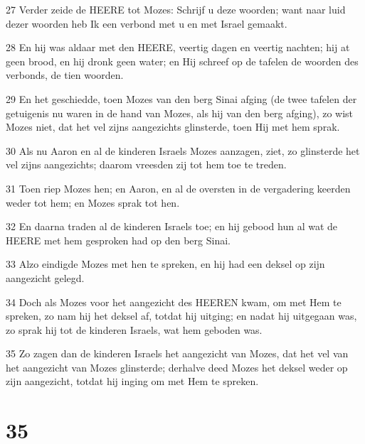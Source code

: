 \par 27 Verder zeide de HEERE tot Mozes: Schrijf u deze woorden; want naar luid dezer woorden heb Ik een verbond met u en met Israel gemaakt.
\par 28 En hij was aldaar met den HEERE, veertig dagen en veertig nachten; hij at geen brood, en hij dronk geen water; en Hij schreef op de tafelen de woorden des verbonds, de tien woorden.
\par 29 En het geschiedde, toen Mozes van den berg Sinai afging (de twee tafelen der getuigenis nu waren in de hand van Mozes, als hij van den berg afging), zo wist Mozes niet, dat het vel zijns aangezichts glinsterde, toen Hij met hem sprak.
\par 30 Als nu Aaron en al de kinderen Israels Mozes aanzagen, ziet, zo glinsterde het vel zijns aangezichts; daarom vreesden zij tot hem toe te treden.
\par 31 Toen riep Mozes hen; en Aaron, en al de oversten in de vergadering keerden weder tot hem; en Mozes sprak tot hen.
\par 32 En daarna traden al de kinderen Israels toe; en hij gebood hun al wat de HEERE met hem gesproken had op den berg Sinai.
\par 33 Alzo eindigde Mozes met hen te spreken, en hij had een deksel op zijn aangezicht gelegd.
\par 34 Doch als Mozes voor het aangezicht des HEEREN kwam, om met Hem te spreken, zo nam hij het deksel af, totdat hij uitging; en nadat hij uitgegaan was, zo sprak hij tot de kinderen Israels, wat hem geboden was.
\par 35 Zo zagen dan de kinderen Israels het aangezicht van Mozes, dat het vel van het aangezicht van Mozes glinsterde; derhalve deed Mozes het deksel weder op zijn aangezicht, totdat hij inging om met Hem te spreken.

\chapter{35}

